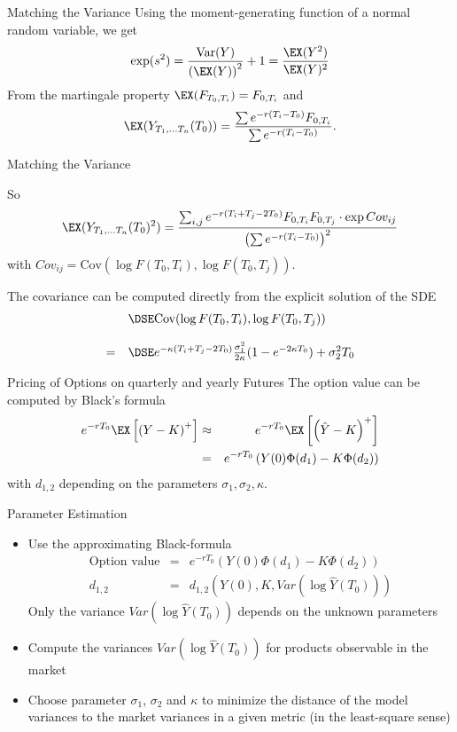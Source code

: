 {Matching the Variance}
Using the moment-generating function of a normal random variable, we get
$$
\exp (s^2) = \frac{\textrm{Var}(Y)}{\left(\EX (Y)\right)^2} + 1  = \frac{\EX(Y^2)}{\EX(Y)^2}
$$
From the martingale property
$\EX (F_{T_0,T_i}) =  F_{0,T_i} $ and
$$ \EX (Y_{T_1, \ldots T_n}(T_0))  =
\frac{\sum e^{-r(T_i-T_0)} F_{0,T_i}}{\sum e^{-r(T_i-T_0)}}.$$


{Matching the Variance}

So
$$
\EX (Y_{T_1, \ldots T_n}(T_0)^2)
=  \frac{\sum_{i, j}e^{-r(T_i+T_j-2T_0)} F_{0,T_i}F_{0,T_j}\cdot \exp Cov_{ij}}{\left(\sum e^{-r(T_i-T_0)}\right)^2}
$$ with
$Cov_{ij} = \textrm{Cov}(\log F(T_0,T_i), \log F(T_0,T_j))$.

The covariance can be computed directly from the explicit solution of the SDE
$$\begin{array}{ll}
& \DSE \textrm{Cov}(\log F(T_0,T_i), \log F(T_0,T_j)) \\*[12pt]
 = & \DSE
 e^{-\kappa(T_i+T_j-2T_0)}\frac{\sigma_1^2}{2\kappa}(1-e^{-2\kappa T_0})+\sigma_2^2 T_0
\end{array}
$$


{Pricing of Options on quarterly and yearly Futures}
The option value can be computed by Black's formula
\begin{eqnarray*}
e^{-rT_0}\EX\left[\left(Y-K\right)^+\right]&\approx & e^{-rT_0}\EX\left[\left(\hat{Y}-K\right)^+\right]\\
& = &e^{-rT_0}\left(Y(0)\Phi(d_1) - K\Phi(d_2)\right)
\end{eqnarray*}
with $d_{1,2}$ depending on the parameters $\sigma_1, \sigma_2, \kappa$.




{Parameter Estimation}
\begin{itemize}
\item<1-> Use the approximating Black-formula
    \begin{eqnarray*}
        \textrm{Option value}&=&    e^{-rT_0}\left(Y(0)\Phi (d_1)-K\Phi(d_2) \right)
\\
        d_{1,2} & = & d_{1,2}\left(Y(0),K,Var(\log \hat{Y}(T_0))\right)
    \end{eqnarray*}
        Only the variance $Var(\log \hat{Y}(T_0))$ depends on the unknown parameters

\item<2-> Compute the variances $Var(\log\hat{Y}(T_0))$ for products observable in the market
\item<3-> Choose parameter $\sigma_1$, $\sigma_2$ and $\kappa$ to minimize the distance of the model variances
to the market variances in a given metric (in the least-square sense)
\end{itemize}




